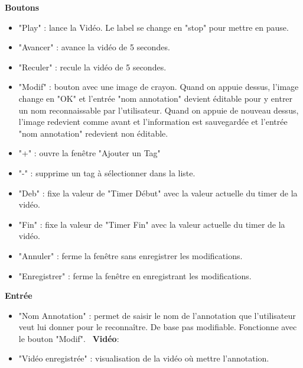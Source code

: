 \documentclass[11pt,french,a4paper]{report}
\begin{document}
\large \textbf{Boutons}\normalsize
    \begin{itemize}[label=, leftmargin=*,parsep=0cm,itemsep=0cm,topsep=0cm]
        \item "Play" : lance la Vidéo. Le label se change en "stop" pour mettre en pause.
        \item "Avancer" : avance la vidéo de 5 secondes.
        \item "Reculer" : recule la vidéo de 5 secondes.
        \item "Modif" : bouton avec une image de crayon. Quand on appuie dessus, l'image change en "OK" et l'entrée "nom annotation" devient éditable
        pour y entrer un nom reconnaissable par l'utilisateur. Quand on appuie de nouveau dessus, l'image redevient comme avant et
        l'information est sauvegardée et l'entrée "nom annotation" redevient non éditable.
        \item "+" : ouvre la fenêtre "Ajouter un Tag"
        \item "-" : supprime un tag à sélectionner dans la liste.
        \item "Deb" : fixe la valeur de "Timer Début" avec la valeur actuelle du timer de la vidéo.
        \item "Fin" : fixe la valeur de "Timer Fin" avec la valeur actuelle du timer de la vidéo.
        \item "Annuler" : ferme la fenêtre sans enregistrer les modifications.
        \item "Enregistrer" : ferme la fenêtre en enregistrant les modifications.
    \end{itemize}
\large \textbf{Entrée}\normalsize
    \begin{itemize}[label=, leftmargin=*,parsep=0cm,itemsep=0cm,topsep=0cm]
        \item "Nom Annotation" : permet de saisir le nom de l'annotation que l'utilisateur veut lui donner pour le reconnaître.
        De base pas modifiable. Fonctionne avec le bouton "Modif".
\large \textbf{Vidéo}\normalsize :
        \item "Vidéo enregistrée" : visualisation de la vidéo où mettre l'annotation.
    \end{itemize}
\end{document}
